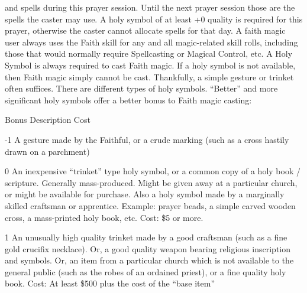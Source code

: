 \documentclass[twoside]{book}
\begin{document}
               and spells during this prayer session. Until the next
               prayer session those are the spells the caster may use. A
               holy symbol of at least +0 quality is required for this
               prayer, otherwise the caster cannot allocate spells for
               that day.   A faith magic user always uses the Faith skill for
               any and all magic-related skill rolls, including those
               that would normally require Spellcasting or Magical
               Control, etc.   A Holy Symbol is always required to cast Faith
               magic. If a holy symbol is not available, then Faith magic
               simply cannot be cast. Thankfully, a simple gesture or
               trinket often suffices. There are different types of holy
               symbols. “Better” and more significant holy
               symbols offer a better bonus to Faith magic casting:
                 
                
                  
                   Bonus   
                   Description   
                   Cost   
                  
                  
                   -1   
                     A gesture made by the Faithful, or a crude
                     marking (such as a cross hastily drawn on a
                     parchment) 
                  
                  
                   0   
                     An inexpensive “trinket” type holy
                     symbol, or a common copy of a holy book / scripture.
                     Generally mass-produced. Might be given away at a
                     particular church, or might be available for
                     purchase. Also a holy symbol made by a marginally
                     skilled craftsman or apprentice. Example: prayer
                     beads, a simple carved wooden cross, a mass-printed
                     holy book, etc. Cost: \$5 or more. 
                  
                  
                   1   
                     An unusually high quality trinket made by a
                     good craftsman (such as a fine gold crucifix
                     necklace). Or, a good quality weapon bearing
                     religious inscription and symbols. Or, an item from
                     a particular church which is not available to the
                     general public (such as the robes of an ordained
                     priest), or a fine quality holy book. 
                     Cost: At least \$500 plus the cost of the
                     “base item” 
                  
\end{document}
